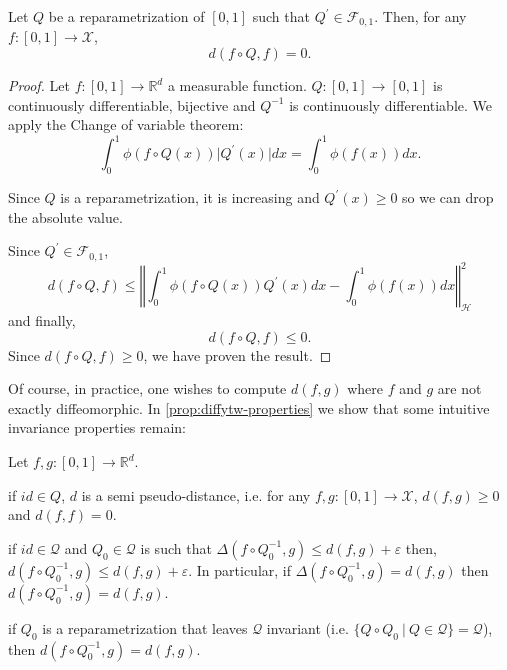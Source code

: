 \begin{theorem}\label{thm:diffytw-invariance}
Let $Q$ be a reparametrization of $[0,1]$ such that $Q^\prime \in \mathcal F_{0, 1}$. Then, for any $f: [0,1] \to \mathcal X$,
\begin{equation}
    d(f\circ Q, f) = 0.
\end{equation}
\end{theorem}

\begin{proof}
Let $f: [0,1] \to\mathbb R^d$ a measurable function. $Q:[0,1] \to [0,1]$ is continuously differentiable, bijective and $Q^{-1}$ is continuously differentiable. We apply the Change of variable theorem:
\begin{equation}
\int_0^1 \phi(f\circ Q(x))\vert Q^\prime(x)\vert dx = \int_0^1 \phi(f(x))dx.
\end{equation}

Since $Q$ is a reparametrization, it is increasing and $Q^\prime(x) \geq 0$ so we can drop the absolute value.

Since $Q^\prime \in \mathcal F_{0,1}$,
\begin{equation}
    d(f\circ Q, f) \leq \left \Vert \int_0^1 \phi(f\circ Q(x))Q^\prime(x)dx - \int_0^1 \phi(f(x))dx\right\Vert_\mathcal H^2
\end{equation}
and finally,
\begin{equation}
    d(f\circ Q, f) \leq 0.
\end{equation}
Since $d(f\circ Q, f) \geq 0$, we have proven the result.
\end{proof}


Of course, in practice, one wishes to compute $d(f, g)$ where $f$ and $g$ are not exactly diffeomorphic. In \cref{prop:diffytw-properties} we show that some intuitive invariance properties remain:
\begin{proposition}\label{prop:diffytw-properties} Let $f, g:[0,1] \to\mathbb R^d$.
\begin{enumthm}
\item if $id \in Q$, $d$ is a semi pseudo-distance, i.e. for any $f, g: [0,1] \to\mathcal X$,  $d(f, g)\geq 0$ and $d(f, f)=0$.\label{prop:properties-1}
\item if $id \in \mathcal Q$ and $Q_0\in\mathcal Q$ is such that $\Delta(f\circ Q_0^{-1}, g) \leq d(f, g) + \varepsilon$ then, $d(f \circ Q_0^{-1}, g) \leq d(f, g) + \varepsilon$. In particular, if $\Delta(f\circ Q_0^{-1}, g) = d(f,g)$ then $d(f\circ Q_0^{-1}, g)=d(f, g)$.\label{prop:properties-2}
\item if $Q_0$ is a reparametrization that leaves $\mathcal Q$ invariant (i.e. $\lbrace Q\circ Q_0 ~\vert~ Q\in \mathcal Q \rbrace = \mathcal Q$), then $d(f\circ Q_0^{-1}, g) = d(f, g)$.\label{prop:properties-3}
\end{enumthm}
\end{proposition}

